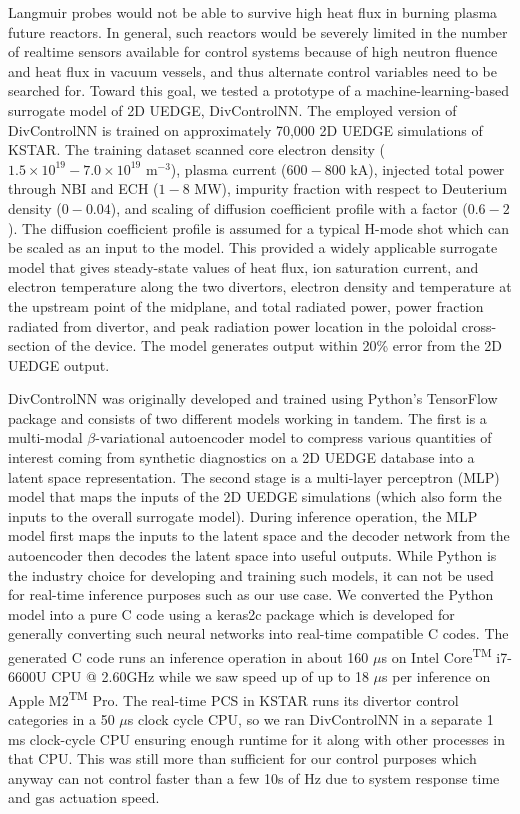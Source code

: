 Langmuir probes would not be able to survive high heat flux in burning plasma future reactors.
In general, such reactors would be severely limited in the number of realtime sensors available for control systems because of high neutron fluence and heat flux in vacuum vessels, and thus alternate control variables need to be searched for.
Toward this goal, we tested a prototype of a machine-learning-based surrogate model of 2D UEDGE, DivControlNN.
The employed version of DivControlNN is trained on approximately 70,000 2D UEDGE simulations of KSTAR.
The training dataset scanned core electron density ($1.5 \times 10^{19} - 7.0 \times 10^{19}$ m$^{-3}$), plasma current ($600-800$ kA), injected total power through NBI and ECH ($1-8$ MW), impurity fraction with respect to Deuterium density ($0-0.04$), and scaling of diffusion coefficient profile with a factor ($0.6 - 2$).
The diffusion coefficient profile is assumed for a typical H-mode shot which can be scaled as an input to the model.
This provided a widely applicable surrogate model that gives steady-state values of heat flux, ion saturation current, and electron temperature along the two divertors, electron density and temperature at the upstream point of the midplane, and total radiated power, power fraction radiated from divertor, and peak radiation power location in the poloidal cross-section of the device.
The model generates output within 20\% error from the 2D UEDGE output.

DivControlNN was originally developed and trained using Python's TensorFlow package and consists of two different models working in tandem.
The first is a multi-modal $\beta$-variational autoencoder\cite{Higgins_2017_ICLR} model to compress various quantities of interest coming from synthetic diagnostics on a 2D UEDGE database into a latent space representation.
The second stage is a multi-layer perceptron (MLP) model that maps the inputs of the 2D UEDGE simulations (which also form the inputs to the overall surrogate model).
During inference operation, the MLP model first maps the inputs to the latent space and the decoder network from the autoencoder then decodes the latent space into useful outputs.
While Python is the industry choice for developing and training such models, it can not be used for real-time inference purposes such as our use case.
We converted the Python model into a pure C code using a keras2c\cite{keras2c} package which is developed for generally converting such neural networks into real-time compatible C codes.
The generated C code runs an inference operation in about 160 $\mu$s on Intel\textsuperscript{\textregistered} Core\textsuperscript{TM} i7-6600U CPU @ 2.60GHz while we saw speed up of up to 18 $\mu$s per inference on Apple\textsuperscript{\textregistered} M2\textsuperscript{TM} Pro.
The real-time PCS in KSTAR runs its divertor control categories in a 50 $\mu$s clock cycle CPU, so we ran DivControlNN in a separate 1 ms clock-cycle CPU ensuring enough runtime for it along with other processes in that CPU.
This was still more than sufficient for our control purposes which anyway can not control faster than a few 10s of Hz due to system response time and gas actuation speed.

